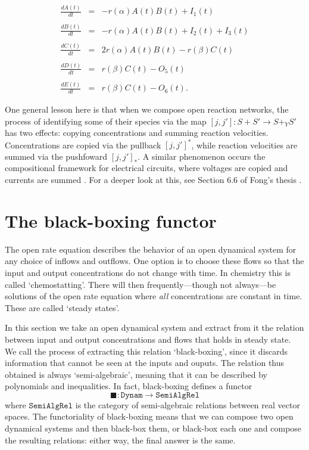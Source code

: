\documentclass{compositionalityarticle}
\newcommand{\Dynam}{\mathtt{Dynam}}
\newcommand{\SemiAlgRel}{\mathtt{SemiAlgRel}}
\newcommand{\maps}{\colon}
\theoremstyle{plain}
\theoremstyle{remark}
\begin{document}
\begin{equation}
\label{eq:open_rate_3}
\begin{array}{rcl} 
\displaystyle{\frac{dA(t)}{dt}} &=& - r(\alpha) A(t) B(t)  + I_1(t)\\ \\
\displaystyle{\frac{dB(t)}{dt}} &=& - r(\alpha) A(t) B(t) + I_2(t) + I_3(t) \\ \\
\displaystyle{\frac{dC(t)}{dt}} &=& 2r(\alpha) A(t) B(t) - r(\beta) C(t)  \\ \\
\displaystyle{\frac{dD(t)}{dt}} &=& r(\beta) C(t) - O_5(t) \\ \\
\displaystyle{\frac{dE(t)}{dt}} &=& r(\beta) C(t) - O_6(t) .
\end{array}
\end{equation}

One general lesson here is that when we compose open reaction networks, the process of identifying some of their species via the map $[j,j'] \maps S + S' \to S +_Y S'$ has two effects: copying concentrations and summing reaction velocities.  Concentrations are copied via the pullback $[j,j']^*$, while reaction velocities are summed via the pushfoward $[j,j']_*$.  A similar phenomenon occurs the compositional framework for electrical circuits, where voltages are copied and currents are summed \cite{BaezFong}.  For a deeper look at this, see Section 6.6 of Fong's thesis \cite{FongThesis}.

\section{The black-boxing functor}
\label{sec:black}

The open rate equation describes the behavior of an open dynamical system for any choice of inflows and outflows.  One option is to choose these flows so that the input and output concentrations do not change with time.  In chemistry this is called `chemostatting'.    There will then frequently---though not always---be solutions of the open rate equation where \emph{all} concentrations are constant in time.   These are called `steady states'.  

In this section we take an open dynamical system and extract from it the relation between input and output concentrations and flows that holds in steady state.  We call the process of extracting this relation `black-boxing', since it discards information that cannot be seen at the inputs and ouputs.  The relation thus obtained is always `semi-algebraic', meaning that it can be described by polynomials and inequalities.  In fact, black-boxing defines a functor 
\[        \blacksquare \maps \Dynam \to \SemiAlgRel \]
where $\SemiAlgRel$ is the category of semi-algebraic relations between real vector spaces.    The functoriality of black-boxing means that we can compose two open dynamical systems and then black-box them, or black-box each one and compose the resulting relations: either way, the final answer is the same.   
\end{document}
